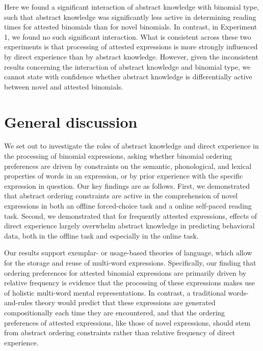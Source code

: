 \documentclass[authoryear]{elsarticle}
\begin{document}
Here we found a significant interaction of abstract knowledge with binomial type, such that abstract knowledge was significantly less active in determining reading times for attested binomials than for novel binomials. In contrast, in Experiment 1, we found no such significant interaction. What is consistent across these two experiments is that processing of attested expressions is more strongly influenced by direct experience than by abstract knowledge. However, given the inconsistent results concerning the interaction of abstract knowledge and binomial type, we cannot state with confidence whether abstract knowledge is differentially active between novel and attested binomials.

\section{General discussion}\label{discussion}

We set out to investigate the roles of abstract knowledge and direct experience in the processing of binomial expressions, asking whether binomial ordering preferences are driven by constraints on the semantic, phonological, and lexical properties of words in an expression, or by prior experience with the specific expression in question. Our key findings are as follows. First, we demonstrated that abstract ordering constraints are active in the comprehension of novel expressions in both an offline forced-choice task and a online self-paced reading task. Second, we demonstrated that for frequently attested expressions, effects of direct experience largely overwhelm abstract knowledge in predicting behavioral data, both in the offline task and especially in the online task.

Our results support exemplar- or usage-based theories of language, which allow for the storage and reuse of multi-word expressions. Specifically, our finding that ordering preferences for attested binomial expressions are primarily driven by relative frequency is evidence that the processing of these expressions makes use of holistic multi-word mental representations. In contrast, a traditional words-and-rules theory would predict that these expressions are generated compositionally each time they are encountered, and that the ordering preferences of attested expressions, like those of novel expressions, should stem from abstract ordering constraints rather than relative frequency of direct experience.

\end{document}
